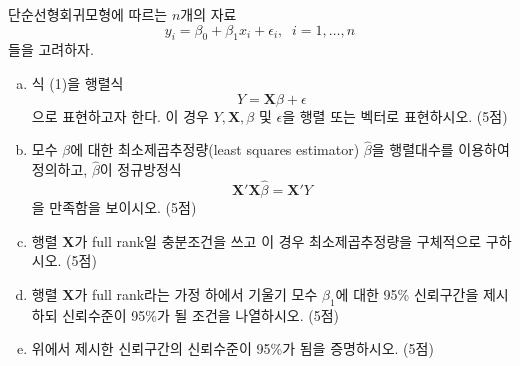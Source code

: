 \documentclass[answers]{exam}
\begin{document}
\begin{questions}
\begin{solution}
    \end{solution}
    \question
    단순선형회귀모형에 따르는 $n$개의 자료
    \begin{equation}
      y_{i} = \beta_{0}+\beta_{1}x_{i}+\epsilon_{i},\;\;i=1,\ldots,n
    \end{equation}
    들을 고려하자.
    \begin{enumerate}[(a)]
      \item 식 (1)을 행렬식
      \begin{equation}
        Y=\mathbf{X}\beta+\epsilon
      \end{equation}
      으로 표현하고자 한다. 이 경우 $Y,\mathbf{X},\beta$ 및 $\epsilon$을 행렬 또는 벡터로 표현하시오. (5점)
      \item 모수 $\beta$에 대한 최소제곱추정량(least squares estimator) $\widehat{\beta}$을 행렬대수를 이용하여 정의하고, $\widehat{\beta}$이 정규방정식
      \begin{equation}
        \mathbf{X}'\mathbf{X}\widehat{\beta}=\mathbf{X}'Y
      \end{equation}
      을 만족함을 보이시오. (5점)
      \item 행렬 $\mathbf{X}$가 full rank일 충분조건을 쓰고 이 경우 최소제곱추정량을 구체적으로 구하시오. (5점)
      \item 행렬 $\mathbf{X}$가 full rank라는 가정 하에서 기울기 모수 $\beta_{1}$에 대한 95\% 신뢰구간을 제시하되 신뢰수준이 95\%가 될 조건을 나열하시오. (5점)
      \item 위에서 제시한 신뢰구간의 신뢰수준이 95\%가 됨을 증명하시오. (5점)
    \end{enumerate}
    \begin{solution}

    \end{solution}
\end{questions}
\end{document}
